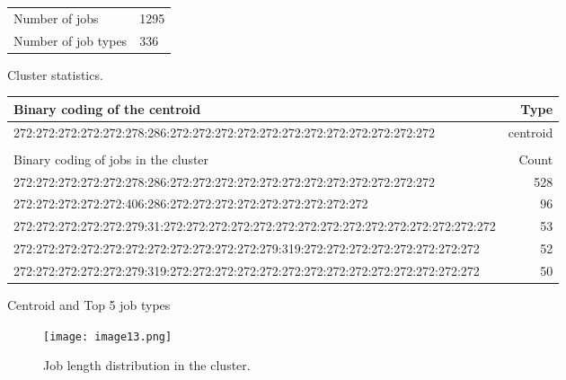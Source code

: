 \documentclass{jhps}
\begin{document}
\noindent\begin{minipage}{\textwidth}
\captionsetup{type=table}

\begingroup
  \begin{subtable}{\textwidth}
  \centering
  \begin{tabular}{ll}
    \centering
    Number of jobs & 1295 \\
    Number of job types & 336 \\
  \end{tabular}
  \caption{Cluster statistics.}
  \label{tab:bin_aggzeros:stats}
  \end{subtable}
\endgroup

\medskip


\begingroup
  \begin{subtable}{\textwidth}
  \centering
  \begin{tiny}
    \begin{tabular}{@{ }l@{ }|@{ }r@{ }}
      \rowcolor{tabhcolor}
      Binary coding of the centroid                                                                         &  Type     \\
      \hline
      272:272:272:272:272:278:286:272:272:272:272:272:272:272:272:272:272:272:272            &  centroid \\
      \multicolumn{2}{l}{}                                                                   \\
      \hline
      \rowcolor{tabhcolor}
      Binary coding of jobs in the cluster                                                                          &  Count    \\
      272:272:272:272:272:278:286:272:272:272:272:272:272:272:272:272:272:272:272            &  528      \\
      272:272:272:272:272:406:286:272:272:272:272:272:272:272:272:272                        &  96       \\
      272:272:272:272:272:279:31:272:272:272:272:272:272:272:272:272:272:272:272:272:272:272 &  53       \\
      272:272:272:272:272:272:272:272:272:272:272:279:319:272:272:272:272:272:272:272:272    &  52       \\
      272:272:272:272:272:279:319:272:272:272:272:272:272:272:272:272:272:272:272:272:272    &  50       \\
    \end{tabular}
  \end{tiny}
  \caption{Centroid and Top 5 job types}
  \label{tab:bin_aggzeros:top_jobs}
  \end{subtable}
\endgroup

\medskip

\begingroup
  \begin{subfigure}{\textwidth}
  \centering
  \texttt{[image: image13.png]}
  \caption{Job length distribution in the cluster.}
  \label{fig:bin_aggzeros:length}
  \end{subfigure}
\endgroup

\label{fig:bin_aggzeros}
\end{minipage}
\end{document}
